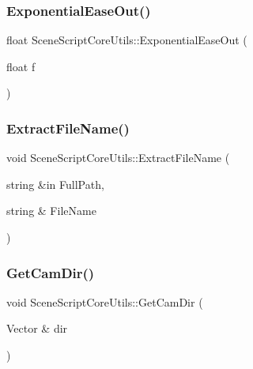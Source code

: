 \hypertarget{class_scene_script_core_utils_a991c1dc5354aad7952355ae48f09aac8}{}\label{class_scene_script_core_utils_a991c1dc5354aad7952355ae48f09aac8} 
\subsubsection{\texorpdfstring{Exponential\+Ease\+Out()}{ExponentialEaseOut()}}
{\footnotesize\ttfamily float Scene\+Script\+Core\+Utils\+::\+Exponential\+Ease\+Out (\begin{DoxyParamCaption}\item[{float}]{f }\end{DoxyParamCaption})}

\hypertarget{class_scene_script_core_utils_a37aee74c8e532f969c94fab04bc54bf9}{}\label{class_scene_script_core_utils_a37aee74c8e532f969c94fab04bc54bf9} 
\subsubsection{\texorpdfstring{Extract\+File\+Name()}{ExtractFileName()}}
{\footnotesize\ttfamily void Scene\+Script\+Core\+Utils\+::\+Extract\+File\+Name (\begin{DoxyParamCaption}\item[{string \&in}]{Full\+Path,  }\item[{string \&}]{File\+Name }\end{DoxyParamCaption})}

\hypertarget{class_scene_script_core_utils_a6e17557a95868df25c7639ad9e3af37f}{}\label{class_scene_script_core_utils_a6e17557a95868df25c7639ad9e3af37f} 
\subsubsection{\texorpdfstring{Get\+Cam\+Dir()}{GetCamDir()}}
{\footnotesize\ttfamily void Scene\+Script\+Core\+Utils\+::\+Get\+Cam\+Dir (\begin{DoxyParamCaption}\item[{Vector \&}]{dir }\end{DoxyParamCaption})}

